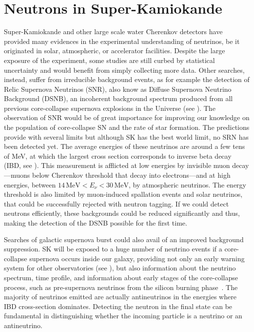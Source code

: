 \section{Neutrons in Super-Kamiokande}
\label{sec:sk_neutron}


Super-Kamiokande and other large scale water Cherenkov detectors have provided %
many evidences in the experimental understanding of neutrinos, %
be it originated in solar, atmospheric, or accelerator facilities.
Despite the large exposure of the experiment, some studies are still curbed by statistical uncertainty %
and would benefit from simply collecting more data.
Other searches, instead, suffer from irreducible background events, as for example the detection of Relic Supernova Neutrinos (SNR), %
also know as Diffuse Supernova Neutrino Background (DSNB), an incoherent background spectrum %
produced from all previous core-collapse supernova explosions in the Universe (see ).
The observation of SNR would be of great importance for improving our knowledge on the population of core-collapse SN %
and the rate of star formation.
The predictions provide with several limits but although SK has the best world limit, no SRN has been detected yet.
The average energies of these neutrinos are around a few tens of MeV, at which the largest cross section %
corresponds to inverse beta decay (IBD, see ).
This measurement is afflicted at low energies by invisible muon decay%
---muons below Cherenkov threshold that decay into electrons---and at high energies, %
between $14\,\text{MeV} < E_\nu < 30\,\text{MeV}$, by atmospheric neutrinos.
The energy threshold is also limited by muon-induced spallation events and solar neutrinos, that could be successfully %
rejected with neutron tagging.
If we could detect neutrons efficiently, these backgrounds could be reduced significantly and thus, %
making the detection of the DSNB possible for the first time.

Searches of galactic supernova burst could also avail of an improved background suppression.
SK will be exposed to a huge number of neutrino events if a core-collapse supernova occurs inside our galaxy, %
providing not only an early warning system for other observatories (see ), %
but also information about the neutrino spectrum, time profile, and information about early stages of the core-collapse process, %
such as pre-supernova neutrinos from the silicon burning phase~\cite{1908.07551}.
The majority of neutrinos emitted are actually antineutrinos in the energies where IBD cross-section dominates.
Detecting the neutron in the final state can be fundamental in distinguishing whether the incoming particle is %
a neutrino or an antineutrino.

